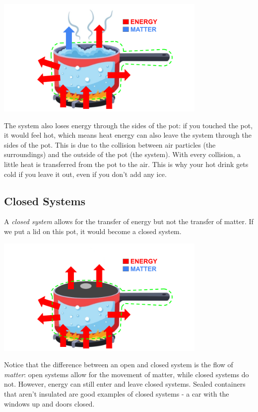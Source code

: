 \begin{center}
\includegraphics[width=4in]{pot_open_arrows.png}
\end{center}

The system also loses energy through the sides of the pot: if you touched the 
pot, it would feel hot, which means heat energy can also leave the system through
the sides of the pot. This is due to the collision between air particles (the 
surroundings) and the outside of the pot (the system). With every collision, a 
little heat is transferred from the pot to the air. This is why your hot drink 
gets cold if you leave it out, even if you don't add any ice. 

\subsection{Closed Systems}
A \textit{closed system} allows for the transfer of energy but not the transfer 
of matter. If we put a lid on this pot, it would become a closed system. 

\begin{center}
\includegraphics[width=4in]{pot_closed_system.png}
\end{center}

Notice that the difference between an open and closed system is the flow of 
\textit{matter}: open systems allow for the movement of matter, while closed 
systems do not. However, energy can still enter and leave closed systems. 
Sealed containers that aren't insulated are good examples of closed systems - 
a car with the windows up and doors closed. 

